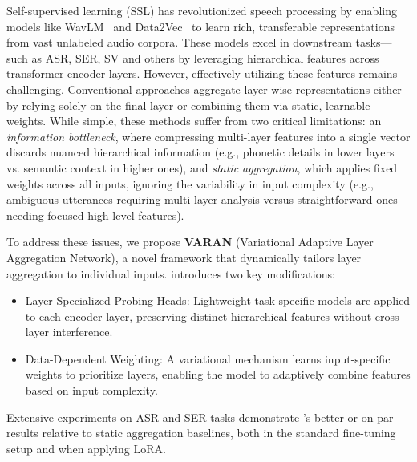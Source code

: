 Self-supervised learning (SSL) has revolutionized speech processing by enabling models like WavLM~\cite{chen2022wavlm} and Data2Vec~\cite{baevski2022data2vec} to learn rich, transferable representations from vast unlabeled audio corpora. These models excel in downstream tasks—such as ASR, SER, SV and others by leveraging hierarchical features across transformer encoder layers. However, effectively utilizing these features remains challenging. Conventional approaches aggregate layer-wise representations either by relying solely on the final layer or combining them via static, learnable weights. While simple, these methods suffer from two critical limitations: an \textit{information bottleneck}, where compressing multi-layer features into a single vector discards nuanced hierarchical information (e.g., phonetic details in lower layers vs. semantic context in higher ones), and \textit{static aggregation}, which applies fixed weights across all inputs, ignoring the variability in input complexity (e.g., ambiguous utterances requiring multi-layer analysis versus straightforward ones needing focused high-level features).

To address these issues, we propose \textbf{VARAN} (Variational Adaptive Layer Aggregation Network), a novel framework that dynamically tailors layer aggregation to individual inputs. \varan introduces two key modifications:
\begin{itemize}
    \item Layer-Specialized Probing Heads: Lightweight task-specific models are applied to each encoder layer, preserving distinct hierarchical features without cross-layer interference.
    \item Data-Dependent Weighting: A variational mechanism learns input-specific weights to prioritize layers, enabling the model to adaptively combine features based on input complexity.
\end{itemize}

Extensive experiments on ASR and SER tasks demonstrate \varan’s better or on-par results relative to static aggregation baselines, both in the standard fine-tuning setup and when applying LoRA.
